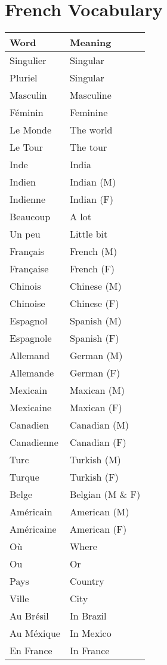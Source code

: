 \section{French Vocabulary}


\begin{longtable}{l  l}
\hline
Word		& Meaning	\\
\hline
\endhead
Singulier 	& Singular 	\\
Pluriel 	& Singular 	\\
Masculin	& Masculine	\\
F\'eminin	& Feminine	\\
Le Monde 	& The world 	\\
Le Tour		& The tour	\\
Inde		& India		\\
Indien		& Indian (M) 	\\
Indienne	& Indian (F)	\\
Beaucoup	& A lot		\\
Un peu		& Little bit	\\
Fran\c{c}ais	& French (M)	\\
Fran\c{c}aise	& French (F)	\\
Chinois		& Chinese (M)	\\
Chinoise	& Chinese (F)	\\
Espagnol	& Spanish (M)	\\
Espagnole	& Spanish (F)	\\
Allemand	& German (M)	\\
Allemande	& German (F)	\\
Mexicain	& Maxican (M)	\\
Mexicaine	& Maxican (F)	\\
Canadien	& Canadian (M)	\\
Canadienne	& Canadian (F)	\\
Turc		& Turkish (M)	\\
Turque		& Turkish (F)	\\
Belge		& Belgian (M \& F)	\\
Am\'ericain	& American (M)	\\
Am\'ericaine	& American (F)	\\
O\`u		& Where		\\
Ou		& Or		\\
Pays		& Country	\\
Ville		& City		\\
Au Br\'esil	& In Brazil	\\
Au M\'exique 	& In Mexico	\\
En France	& In France	\\

\end{longtable}
